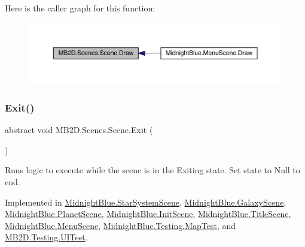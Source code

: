 Here is the caller graph for this function\+:
\nopagebreak
\begin{figure}[H]
\begin{center}
\leavevmode
\includegraphics[width=350pt]{class_m_b2_d_1_1_scenes_1_1_scene_a932d33071ecb4c5187367825dba72324_icgraph}
\end{center}
\end{figure}
\hypertarget{class_m_b2_d_1_1_scenes_1_1_scene_a099b79e16d23b67349847999d2336813}{}\label{class_m_b2_d_1_1_scenes_1_1_scene_a099b79e16d23b67349847999d2336813} 
\subsubsection{\texorpdfstring{Exit()}{Exit()}}
{\footnotesize\ttfamily abstract void M\+B2\+D.\+Scenes.\+Scene.\+Exit (\begin{DoxyParamCaption}{ }\end{DoxyParamCaption})\hspace{0.3cm}{\ttfamily [pure virtual]}}



Runs logic to execute while the scene is in the Exiting state. Set state to Null to end. 



Implemented in \hyperlink{class_midnight_blue_1_1_star_system_scene_ad533ba93e597964d015099031a85cb77}{Midnight\+Blue.\+Star\+System\+Scene}, \hyperlink{class_midnight_blue_1_1_galaxy_scene_a7a96978e050da997330bcc0f3cd00f9e}{Midnight\+Blue.\+Galaxy\+Scene}, \hyperlink{class_midnight_blue_1_1_planet_scene_af3aab90a13294493e1f2cd29b0fb60e6}{Midnight\+Blue.\+Planet\+Scene}, \hyperlink{class_midnight_blue_1_1_init_scene_a16fc773b06a711e1ba35dda44e3edc3e}{Midnight\+Blue.\+Init\+Scene}, \hyperlink{class_midnight_blue_1_1_title_scene_aed29e37e9f849cc8f8443bae057a8eb8}{Midnight\+Blue.\+Title\+Scene}, \hyperlink{class_midnight_blue_1_1_menu_scene_acc60288dc2dff4d612b7a63615165de5}{Midnight\+Blue.\+Menu\+Scene}, \hyperlink{class_midnight_blue_1_1_testing_1_1_map_test_a7dfcf609b9fd898f377297a0075d2159}{Midnight\+Blue.\+Testing.\+Map\+Test}, and \hyperlink{class_m_b2_d_1_1_testing_1_1_u_i_test_ad7ad379db3fc9990e634b3edbd4b1a41}{M\+B2\+D.\+Testing.\+U\+I\+Test}.

